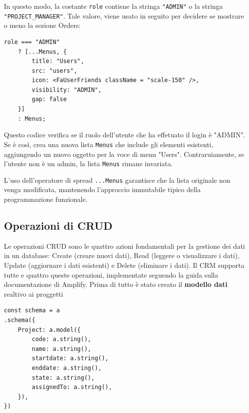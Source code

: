 \documentclass[target=bach,aauheader=,style=]{thud}
\begin{document}
\noindent In questo modo, la costante \texttt{role} contiene la stringa \texttt{"ADMIN"} o la stringa  \texttt{"PROJECT\_MANAGER"}. Tale valore, viene usato in seguito per decidere se mostrare o meno la sezione Orders:

\begin{lstlisting}[caption=Verifica ruolo]
role === "ADMIN" 
    ? [...Menus, {
        title: "Users",
        src: "users",
        icon: <FaUserFriends className = "scale-150" />,
        visibility: "ADMIN",
        gap: false
    }]
    : Menus;
\end{lstlisting}

\noindent Questo codice verifica se il ruolo dell'utente che ha effetuato il login è "ADMIN". Se è così, crea una nuova lista \texttt{Menus} che include gli elementi esistenti, aggiungendo un nuovo oggetto per la voce di menu "Users". Contraruiamente, se l'utente non è un admin, la lista \texttt{Menus} rimane invariata. 

\noindent L'uso dell'operatore di spread \texttt{...Menus} garantisce che la lista originale non venga modificata, mantenendo l'approccio immutabile tipico della programmazione funzionale.

\subsection{Operazioni di CRUD}
Le operazioni CRUD sono le quattro azioni fondamentali per la gestione dei dati in un database: Create (creare nuovi dati), Read (leggere o visualizzare i dati), Update (aggiornare i dati esistenti) e Delete (eliminare i dati). Il CRM supporta tutte e quattro queste operazioni, implementate seguendo la guida \cite{awsamplifynextjs2024} sulla documentazione di Amplify. Prima di tutto è stato creato il \textbf{modello dati} realtivo ai proggetti

\begin{lstlisting}[caption=Parte del file \texttt{amplify/data/resource.ts}]
const schema = a
.schema({
    Project: a.model({
        code: a.string(),
        name: a.string(),
        startdate: a.string(),
        enddate: a.string(),
        state: a.string(),
        assignedTo: a.string(),
    }),
})
\end{lstlisting}
\end{document}
